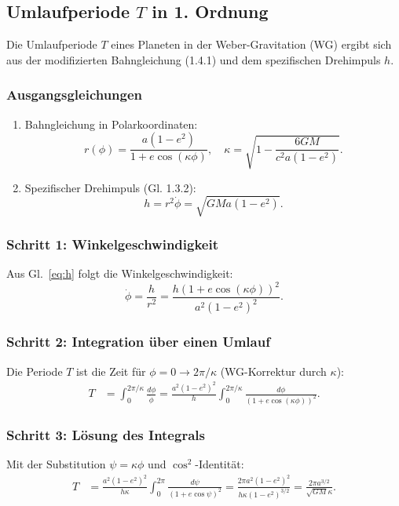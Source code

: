 \newpage
\subsection{Umlaufperiode $T$ in 1. Ordnung}
Die Umlaufperiode $T$ eines Planeten in der Weber-Gravitation (WG) ergibt sich aus der modifizierten Bahngleichung (1.4.1) und dem spezifischen Drehimpuls $h$. 

\subsubsection*{Ausgangsgleichungen}
\begin{enumerate}
    \item Bahngleichung in Polarkoordinaten:
    \begin{equation}
        r(\phi) = \frac{a(1-e^2)}{1 + e \cos(\kappa \phi)}, \quad \kappa = \sqrt{1 - \frac{6GM}{c^2 a(1-e^2)}}.
        \label{eq:bahn}
    \end{equation}
    
    \item Spezifischer Drehimpuls (Gl. 1.3.2):
    \begin{equation}
        h = r^2 \dot{\phi} = \sqrt{GMa(1-e^2)}.
        \label{eq:h}
    \end{equation}
\end{enumerate}

\subsubsection*{Schritt 1: Winkelgeschwindigkeit}
Aus Gl.~\eqref{eq:h} folgt die Winkelgeschwindigkeit:
\begin{equation}
    \dot{\phi} = \frac{h}{r^2} = \frac{h(1 + e \cos(\kappa \phi))^2}{a^2(1-e^2)^2}.
    \label{eq:dotphi}
\end{equation}

\subsubsection*{Schritt 2: Integration über einen Umlauf}
Die Periode $T$ ist die Zeit für $\phi = 0 \to 2\pi/\kappa$ (WG-Korrektur durch $\kappa$):
\begin{align}
    T &= \int_0^{2\pi/\kappa} \frac{d\phi}{\dot{\phi}} 
       = \frac{a^2(1-e^2)^2}{h} \int_0^{2\pi/\kappa} \frac{d\phi}{(1 + e \cos(\kappa \phi))^2}.
       \label{eq:T_integral_1}
\end{align}

\subsubsection*{Schritt 3: Lösung des Integrals}
Mit der Substitution $\psi = \kappa \phi$ und $\cos^2$-Identität:
\begin{align}
    T &= \frac{a^2(1-e^2)^2}{h \kappa} \int_0^{2\pi} \frac{d\psi}{(1 + e \cos \psi)^2} 
       = \frac{2\pi a^2(1-e^2)^2}{h \kappa (1-e^2)^{3/2}} 
       = \frac{2\pi a^{3/2}}{\sqrt{GM} \kappa}.
       \label{eq:T_solution}
\end{align}

